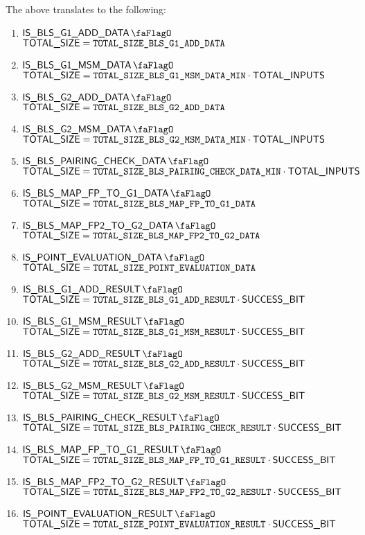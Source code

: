 \saNote{} The above translates to the following:
\begin{enumerate}
    \item \If $\isBlsGOneAddData$         \Then $\textsf{TOTAL\_SIZE} = \texttt{TOTAL\_SIZE\_BLS\_G1\_ADD\_DATA}$
    \item \If $\isBlsGOneMsmData$         \Then $\textsf{TOTAL\_SIZE} = \texttt{TOTAL\_SIZE\_BLS\_G1\_MSM\_DATA\_MIN} \cdot \textsf{TOTAL\_INPUTS}$
    \item \If $\isBlsGTwoAddData$         \Then $\textsf{TOTAL\_SIZE} = \texttt{TOTAL\_SIZE\_BLS\_G2\_ADD\_DATA}$
    \item \If $\isBlsGTwoMsmData$         \Then $\textsf{TOTAL\_SIZE} = \texttt{TOTAL\_SIZE\_BLS\_G2\_MSM\_DATA\_MIN} \cdot \textsf{TOTAL\_INPUTS}$
    \item \If $\isBlsPairingCheckData$    \Then $\textsf{TOTAL\_SIZE} = \texttt{TOTAL\_SIZE\_BLS\_PAIRING\_CHECK\_DATA\_MIN} \cdot \textsf{TOTAL\_INPUTS}$
    \item \If $\isBlsMapFpToGOneData$     \Then $\textsf{TOTAL\_SIZE} = \texttt{TOTAL\_SIZE\_BLS\_MAP\_FP\_TO\_G1\_DATA}$
    \item \If $\isBlsMapFpTwoToGTwoData$  \Then $\textsf{TOTAL\_SIZE} = \texttt{TOTAL\_SIZE\_BLS\_MAP\_FP2\_TO\_G2\_DATA}$
    \item \If $\isPointEvaluationData$    \Then $\textsf{TOTAL\_SIZE} = \texttt{TOTAL\_SIZE\_POINT\_EVALUATION\_DATA}$
    \item \If $\isBlsGOneAddResult$       \Then $\textsf{TOTAL\_SIZE} = \texttt{TOTAL\_SIZE\_BLS\_G1\_ADD\_RESULT} \cdot \textsf{SUCCESS\_BIT}$
    \item \If $\isBlsGOneMsmResult$       \Then $\textsf{TOTAL\_SIZE} = \texttt{TOTAL\_SIZE\_BLS\_G1\_MSM\_RESULT} \cdot \textsf{SUCCESS\_BIT}$
    \item \If $\isBlsGTwoAddResult$       \Then $\textsf{TOTAL\_SIZE} = \texttt{TOTAL\_SIZE\_BLS\_G2\_ADD\_RESULT} \cdot \textsf{SUCCESS\_BIT}$
    \item \If $\isBlsGTwoMsmResult$       \Then $\textsf{TOTAL\_SIZE} = \texttt{TOTAL\_SIZE\_BLS\_G2\_MSM\_RESULT} \cdot \textsf{SUCCESS\_BIT}$
    \item \If $\isBlsPairingCheckResult$  \Then $\textsf{TOTAL\_SIZE} = \texttt{TOTAL\_SIZE\_BLS\_PAIRING\_CHECK\_RESULT} \cdot \textsf{SUCCESS\_BIT}$
    \item \If $\isBlsMapFpToGOneResult$   \Then $\textsf{TOTAL\_SIZE} = \texttt{TOTAL\_SIZE\_BLS\_MAP\_FP\_TO\_G1\_RESULT} \cdot \textsf{SUCCESS\_BIT}$
    \item \If $\isBlsMapFpTwoToGTwoResult$ \Then $\textsf{TOTAL\_SIZE} = \texttt{TOTAL\_SIZE\_BLS\_MAP\_FP2\_TO\_G2\_RESULT} \cdot \textsf{SUCCESS\_BIT}$
    \item \If $\isPointEvaluationResult$  \Then $\textsf{TOTAL\_SIZE} = \texttt{TOTAL\_SIZE\_POINT\_EVALUATION\_RESULT} \cdot \textsf{SUCCESS\_BIT}$
\end{enumerate}


